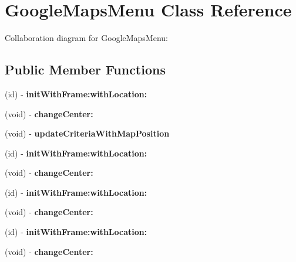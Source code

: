 \hypertarget{interface_google_maps_menu}{
\section{\-Google\-Maps\-Menu \-Class \-Reference}
\label{interface_google_maps_menu}
}


\-Collaboration diagram for \-Google\-Maps\-Menu\-:
\subsection*{\-Public \-Member \-Functions}
\begin{DoxyCompactItemize}
\item 
\hypertarget{interface_google_maps_menu_ae0c4e22d5c0c601f3c19e517dc4ac72a}{
(id) -\/ {\bfseries init\-With\-Frame\-:with\-Location\-:}}
\label{interface_google_maps_menu_ae0c4e22d5c0c601f3c19e517dc4ac72a}

\item 
\hypertarget{interface_google_maps_menu_abaaf60d77f8ec63dc3e9f89f9a1461d0}{
(void) -\/ {\bfseries change\-Center\-:}}
\label{interface_google_maps_menu_abaaf60d77f8ec63dc3e9f89f9a1461d0}

\item 
\hypertarget{interface_google_maps_menu_a604db491fdb7d6de7dc082f7696a052b}{
(void) -\/ {\bfseries update\-Criteria\-With\-Map\-Position}}
\label{interface_google_maps_menu_a604db491fdb7d6de7dc082f7696a052b}

\item 
\hypertarget{interface_google_maps_menu_ae0c4e22d5c0c601f3c19e517dc4ac72a}{
(id) -\/ {\bfseries init\-With\-Frame\-:with\-Location\-:}}
\label{interface_google_maps_menu_ae0c4e22d5c0c601f3c19e517dc4ac72a}

\item 
\hypertarget{interface_google_maps_menu_abaaf60d77f8ec63dc3e9f89f9a1461d0}{
(void) -\/ {\bfseries change\-Center\-:}}
\label{interface_google_maps_menu_abaaf60d77f8ec63dc3e9f89f9a1461d0}

\item 
\hypertarget{interface_google_maps_menu_ae0c4e22d5c0c601f3c19e517dc4ac72a}{
(id) -\/ {\bfseries init\-With\-Frame\-:with\-Location\-:}}
\label{interface_google_maps_menu_ae0c4e22d5c0c601f3c19e517dc4ac72a}

\item 
\hypertarget{interface_google_maps_menu_abaaf60d77f8ec63dc3e9f89f9a1461d0}{
(void) -\/ {\bfseries change\-Center\-:}}
\label{interface_google_maps_menu_abaaf60d77f8ec63dc3e9f89f9a1461d0}

\item 
\hypertarget{interface_google_maps_menu_ae0c4e22d5c0c601f3c19e517dc4ac72a}{
(id) -\/ {\bfseries init\-With\-Frame\-:with\-Location\-:}}
\label{interface_google_maps_menu_ae0c4e22d5c0c601f3c19e517dc4ac72a}

\item 
\hypertarget{interface_google_maps_menu_abaaf60d77f8ec63dc3e9f89f9a1461d0}{
(void) -\/ {\bfseries change\-Center\-:}}
\label{interface_google_maps_menu_abaaf60d77f8ec63dc3e9f89f9a1461d0}

\end{DoxyCompactItemize}
